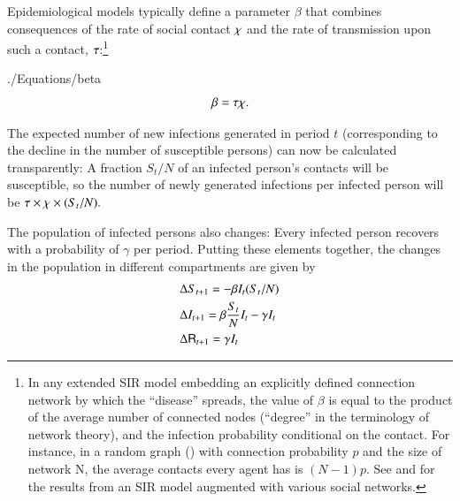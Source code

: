 Epidemiological models typically define a parameter $\beta$ that combines consequences of the rate of social contact $\chi$ and the rate of transmission upon such a contact, $\tau$:\footnote{In any extended SIR model embedding an explicitly defined connection network by which the ``disease'' spreads, the value of $\beta$ is equal to the product of the average number of connected nodes (``degree'' in the terminology of network theory), and the infection probability conditional on the contact. For instance, in a random graph (\cite{erdos1960evolution})  with connection probability $p$ and the size of network N, the average contacts every agent has is $(N-1)p$. See \cite{newman2002spread} and  \cite{jackson_social_2010} for the results from an SIR model augmented with various social networks.}
\begin{verbatimwrite}{./Equations/beta}
\begin{equation}
	\label{eq:beta}
    \beta  = \tau \chi.
\end{equation}
\end{verbatimwrite}


The expected number of new infections generated in period $t$ (corresponding to the decline in the number of susceptible persons) can now be calculated transparently: A fraction $S_{t}/N$ of an infected person's contacts will be susceptible, so the number of newly generated infections per infected person will be $\tau \times \chi \times (S_{t}/N).$

The population of infected persons also changes: Every infected person recovers with a probability of $\gamma$ per period.  Putting these elements together, the  changes in the population in different compartments are given by
\begin{equation}
	\label{eq:sirdyn}
	\begin{split}
	&	\Delta S_{t+1} = -\beta I_{t}(S_{t}/N) \\
	&	\Delta I_{t+1} = \beta \frac{S_{t}}{N}I_{t} - \gamma I_t \\
&		\Delta \mathsf{R}_{t+1} = \gamma I_t
	\end{split}
\end{equation}


